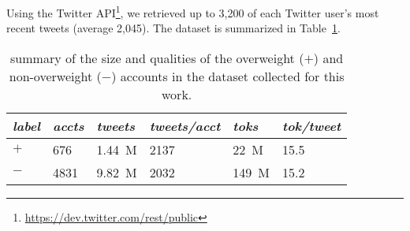 Using the Twitter API\footnote{\url{https://dev.twitter.com/rest/public}}, we retrieved up to 3,200 of each Twitter user's most recent tweets (average 2,045).
The dataset is summarized in Table~\ref{tab:data}.

\begin{table}
\centering\small
\begin{tabular}{@{}l l l l l l@{}}
\toprule
\textit{label} 	& \textit{accts}	& \textit{tweets}	& \textit{tweets/acct}	& \textit{toks}	& \textit{tok/tweet}	\\ 
\midrule
$+$	& 676	& 1.44~M	& 2137	& 22~M	& 15.5	\\
$-$	& 4831	& 9.82~M	& 2032	& 149~M	& 15.2	\\
\bottomrule
\end{tabular}
\caption{{\small summary of the size and qualities of the overweight ($+$) and non-overweight ($-$) accounts in the dataset collected for this work.}}
\label{tab:data}
\end{table}
 
